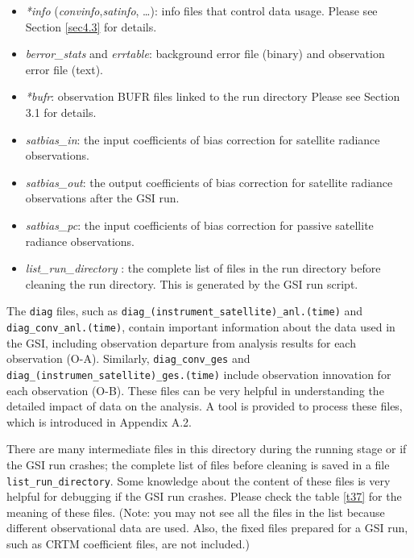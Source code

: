 \begin{itemize}
\item \textit{*info} (\textit{convinfo},\textit{satinfo}, \dots): info files that control data usage. Please see Section \ref{sec4.3} for details.
\item \textit{berror\_stats} and \textit{errtable}: background error file (binary) and observation error file (text).
\item \textit{*bufr}: observation BUFR files linked to the run directory Please see Section 3.1 for details.
\item \textit{satbias\_in}: the input coefficients of bias correction for satellite radiance observations.
\item \textit{satbias\_out}: the output coefficients of bias correction for satellite radiance observations after the GSI run.
\item \textit{satbias\_pc}: the input coefficients of bias correction for passive satellite radiance observations.
\item \textit{list\_run\_directory} : the complete list of files in the run directory before cleaning the run directory. This is generated by the GSI run script.
\end{itemize}

The \verb|diag| files, such as \verb|diag_(instrument_satellite)_anl.(time)| and \verb|diag_conv_anl.(time)|, contain important information about the data used in the GSI, including observation departure from analysis results for each observation (O-A). Similarly, \verb|diag_conv_ges| and \verb|diag_(instrumen_satellite)_ges.(time)| include observation innovation for each observation (O-B). These files can be very helpful in understanding the detailed impact of data on the analysis. A tool is provided to process these files, which is introduced in Appendix A.2.

There are many intermediate files in this directory during the running stage or if the GSI run crashes; the complete list of files before cleaning is saved in a file \verb|list_run_directory|. Some knowledge about the content of these files is very helpful for debugging if the GSI run crashes. Please check the table \ref{t37}  for the meaning of these files. (Note: you may not see all the files in the list because different observational data are used. Also, the fixed files prepared for a GSI run, such as CRTM coefficient files, are not included.) 

